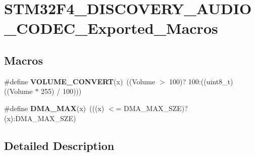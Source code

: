 \hypertarget{group___s_t_m32_f4___d_i_s_c_o_v_e_r_y___a_u_d_i_o___c_o_d_e_c___exported___macros}{\section{S\-T\-M32\-F4\-\_\-\-D\-I\-S\-C\-O\-V\-E\-R\-Y\-\_\-\-A\-U\-D\-I\-O\-\_\-\-C\-O\-D\-E\-C\-\_\-\-Exported\-\_\-\-Macros}
\label{group___s_t_m32_f4___d_i_s_c_o_v_e_r_y___a_u_d_i_o___c_o_d_e_c___exported___macros}
}
\subsection*{Macros}
\begin{DoxyCompactItemize}
\item 
\hypertarget{group___s_t_m32_f4___d_i_s_c_o_v_e_r_y___a_u_d_i_o___c_o_d_e_c___exported___macros_gae45dcf6c91f29a284cc785318e53a101}{\#define {\bfseries V\-O\-L\-U\-M\-E\-\_\-\-C\-O\-N\-V\-E\-R\-T}(x)~((Volume $>$ 100)? 100\-:((uint8\-\_\-t)((Volume $\ast$ 255) / 100)))}\label{group___s_t_m32_f4___d_i_s_c_o_v_e_r_y___a_u_d_i_o___c_o_d_e_c___exported___macros_gae45dcf6c91f29a284cc785318e53a101}

\item 
\hypertarget{group___s_t_m32_f4___d_i_s_c_o_v_e_r_y___a_u_d_i_o___c_o_d_e_c___exported___macros_ga00daadfb818ed6a076e9e503135645d3}{\#define {\bfseries D\-M\-A\-\_\-\-M\-A\-X}(x)~(((x) $<$= D\-M\-A\-\_\-\-M\-A\-X\-\_\-\-S\-Z\-E)? (x)\-:D\-M\-A\-\_\-\-M\-A\-X\-\_\-\-S\-Z\-E)}\label{group___s_t_m32_f4___d_i_s_c_o_v_e_r_y___a_u_d_i_o___c_o_d_e_c___exported___macros_ga00daadfb818ed6a076e9e503135645d3}

\end{DoxyCompactItemize}


\subsection{Detailed Description}
